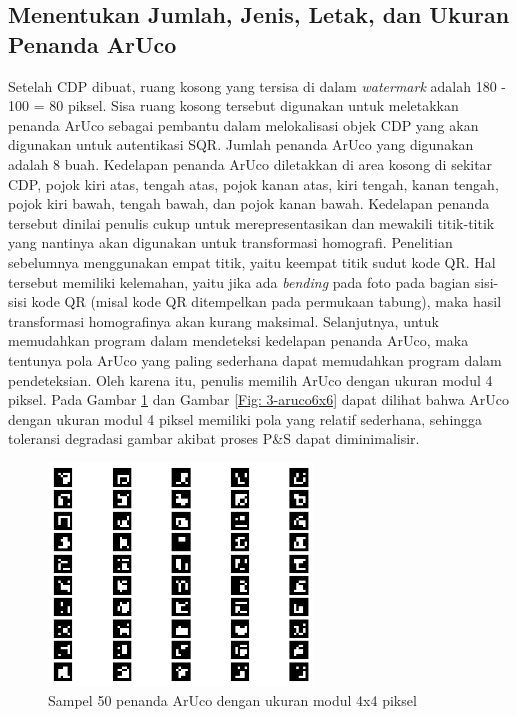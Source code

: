 \subsection{Menentukan Jumlah, Jenis, Letak, dan Ukuran Penanda ArUco}
Setelah CDP dibuat, ruang kosong yang tersisa di dalam \emph{watermark} adalah 180 - 100 = 80 piksel. Sisa ruang kosong tersebut digunakan untuk meletakkan
penanda ArUco sebagai pembantu dalam melokalisasi objek CDP yang akan digunakan untuk autentikasi SQR. Jumlah penanda ArUco yang digunakan adalah 8 buah.
Kedelapan penanda ArUco diletakkan di area kosong di sekitar CDP, pojok kiri atas, tengah atas, pojok kanan atas, kiri tengah, kanan tengah, pojok kiri bawah,
tengah bawah, dan pojok kanan bawah. Kedelapan penanda tersebut dinilai penulis cukup untuk merepresentasikan dan mewakili titik-titik yang nantinya akan
digunakan untuk transformasi homografi. Penelitian sebelumnya menggunakan empat titik, yaitu keempat titik sudut kode QR. Hal tersebut memiliki kelemahan,
yaitu jika ada \emph{bending} pada foto pada bagian sisi-sisi kode QR (misal kode QR ditempelkan pada permukaan tabung), maka hasil transformasi homografinya
akan kurang maksimal. Selanjutnya, untuk memudahkan program dalam mendeteksi kedelapan penanda ArUco, maka tentunya pola ArUco yang paling sederhana dapat
memudahkan program dalam pendeteksian. Oleh karena itu, penulis memilih ArUco dengan ukuran modul 4 piksel. Pada Gambar \ref{Fig: 3-aruco4x4} dan Gambar
\ref{Fig: 3-aruco6x6} dapat dilihat bahwa ArUco dengan ukuran modul 4 piksel memiliki pola yang relatif sederhana, sehingga toleransi degradasi gambar akibat
proses P\&S dapat diminimalisir.

\begin{figure}[!ht]
	\centering
	\includegraphics[width=7cm]{contents/chapter-3/3-aruco4x4.png}
	\caption{Sampel 50 penanda ArUco dengan ukuran modul 4x4 piksel}
	\label{Fig: 3-aruco4x4}
\end{figure}

